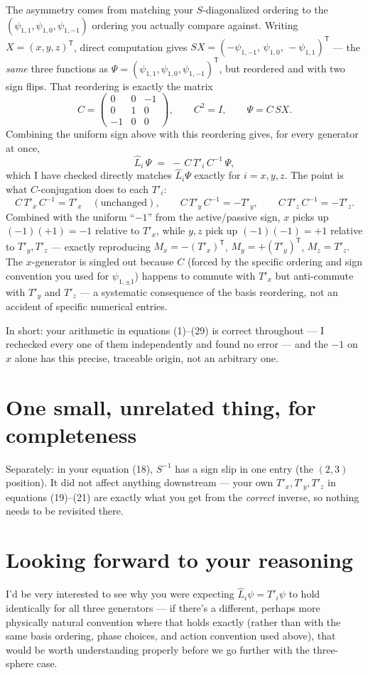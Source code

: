 \documentclass[11pt]{article}
\begin{document}
The asymmetry comes from matching your $S$-diagonalized ordering to the
$(\psi_{1,1},\psi_{1,0},\psi_{1,-1})$ ordering you actually compare
against. Writing $X=(x,y,z)^{\mathsf T}$, direct computation gives
$S X = (-\psi_{1,-1},\,\psi_{1,0},\,-\psi_{1,1})^{\mathsf T}$ --- the
\emph{same} three functions as $\Psi=(\psi_{1,1},\psi_{1,0},\psi_{1,-1})^{\mathsf T}$,
but reordered and with two sign flips. That reordering is exactly the
matrix
\[
  C=\begin{pmatrix}0&0&-1\\0&1&0\\-1&0&0\end{pmatrix},
  \qquad C^2=I,\qquad \Psi = C\,S X .
\]
Combining the uniform sign above with this reordering gives, for every
generator at once,
\[
  \hat L_i\,\Psi \;=\; -\,C\,T'_i\,C^{-1}\,\Psi ,
\]
which I have checked directly matches $\hat L_i\Psi$ exactly for
$i=x,y,z$. The point is what $C$-conjugation does to each $T'_i$:
\[
  C\,T'_x\,C^{-1} = T'_x \quad(\text{unchanged}), \qquad
  C\,T'_y\,C^{-1} = -T'_y, \qquad
  C\,T'_z\,C^{-1} = -T'_z .
\]
Combined with the uniform ``$-1$'' from the active/passive sign, $x$ picks
up $(-1)(+1)=-1$ relative to $T'_x$, while $y,z$ pick up
$(-1)(-1)=+1$ relative to $T'_y,T'_z$ --- exactly reproducing
$M_x=-(T'_x)^{\mathsf T}$, $M_y=+(T'_y)^{\mathsf T}$, $M_z=T'_z$. The
$x$-generator is singled out because $C$ (forced by the specific ordering
and sign convention you used for $\psi_{1,\pm1}$) happens to commute with
$T'_x$ but anti-commute with $T'_y$ and $T'_z$ --- a systematic consequence
of the basis reordering, not an accident of specific numerical entries.

In short: your arithmetic in equations (1)--(29) is correct throughout --- I
rechecked every one of them independently and found no error --- and the
$-1$ on $x$ alone has this precise, traceable origin, not an arbitrary one.

\section{One small, unrelated thing, for completeness}

Separately: in your equation (18), $S^{-1}$ has a sign slip in one entry
(the $(2,3)$ position). It did not affect anything downstream --- your
own $T'_x,T'_y,T'_z$ in equations (19)--(21) are exactly what you get from
the \emph{correct} inverse, so nothing needs to be revisited there.

\section{Looking forward to your reasoning}

I'd be very interested to see why you were expecting
$\hat L_i\psi = T'_i\psi$ to hold identically for all three generators ---
if there's a different, perhaps more physically natural convention where
that holds exactly (rather than with the same basis ordering, phase
choices, and action convention used above), that would be worth
understanding properly before we go further with the three-sphere case.
\end{document}
